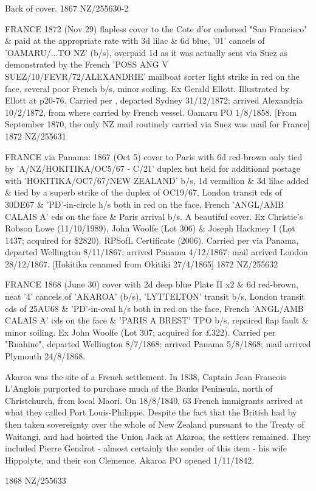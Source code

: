 \documentclass[justified]{tufte-book}
\begin{document}
%
{Back of cover.}%
{1867}%
{NZ/255630-2}%
{}%
{}
{}%
{}

%
{FRANCE 1872 (Nov 29) flapless cover to the Cote d'or endorsed "San Francisco" \& paid at the appropriate rate with 3d lilac \& 6d blue, '01' cancels of 'OAMARU/...TO NZ' (b/s), overpaid 1d as it was actually sent via Suez as demonstrated by the French 'POSS ANG V SUEZ/10/FEVR/72/ALEXANDRIE' mailboat sorter light strike in red on the face, several poor French b/s, minor soiling. Ex Gerald Ellott. Illustrated by Ellott at p20-76. Carried per , departed Sydney 31/12/1872; arrived Alexandria 10/2/1872, from where carried by French vessel. Oamaru PO 1/8/1858. [From September 1870, the only NZ mail routinely carried via Suez was mail for France]}%
{1872}%
{NZ/255631}%
{}%
{}
{}%
{}

%
{FRANCE via Panama: 1867 (Oct 5) cover to Paris with 6d red-brown only tied by 'A/NZ/HOKITIKA/OC5/67 - C/21' duplex but held for additional postage with 'HOKITIKA/OC7/67/NEW ZEALAND' b/s, 1d vermilion \& 3d lilac added \& tied by a superb strike of the duplex of OC19/67, London transit cds of 30DE67 \& 'PD'-in-circle h/s both in red on the face, French 'ANGL/AMB CALAIS A' cds on the face \& Paris arrival b/s. A beautiful cover. Ex Christie's Robson Lowe (11/10/1989), John Woolfe (Lot 306) \& Joseph Hackmey I (Lot 1437; acquired for \$2820). RPSofL Certificate (2006). Carried per  via Panama, departed Wellington 8/11/1867; arrived Panama 4/12/1867; mail arrived London 28/12/1867. [Hokitika renamed from Okitiki 27/4/1865]}%
{1872}%
{NZ/255632}%
{}%
{}
{}%
{}


%
{FRANCE 1868 (June 30) cover with 2d deep blue Plate II x2 \& 6d red-brown, neat '4' cancels of 'AKAROA' (b/s), 'LYTTELTON' transit b/s, London transit cds of 25AU68 \& 'PD'-in-oval h/s both in red on the face, French 'ANGL/AMB CALAIS A' cds on the face \& 'PARIS A BREST' TPO b/s, repaired flap fault \& minor soiling. Ex John Woolfe (Lot 307; acquired for £322). Carried per "Ruahine", departed Wellington 8/7/1868; arrived Panama 5/8/1868; mail arrived Plymouth 24/8/1868. 

Akaroa was the site of a French settlement. In 1838, Captain Jean Francois L'Anglois purported to purchase much of the Banks Peninsula, north of Christchurch, from local Maori. On 18/8/1840, 63 French immigrants arrived at what they called Port Louis-Philippe. Despite the fact that the British had by then taken sovereignty over the whole of New Zealand pursuant to the Treaty of Waitangi, and had hoisted the Union Jack at Akaroa, the settlers remained. They included Pierre Gendrot - almost certainly the sender of this item - his wife Hippolyte, and their son Clemence. Akaroa PO opened 1/11/1842.}%
{1868}%
{NZ/255633}%
{}%
{}
{}%
{}
\end{document}

